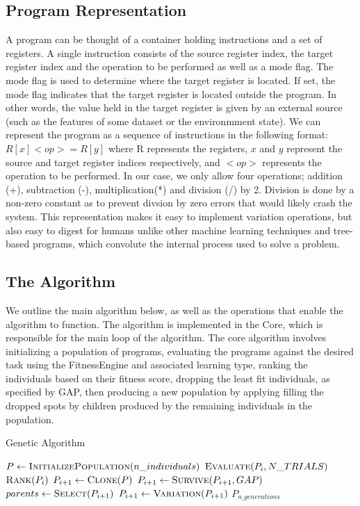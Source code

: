 \documentclass[12pt, final]{dalcsthesis}
\begin{document}
\subsection{Program Representation}
A program can be thought of a container holding instructions and a set of registers. A single instruction consists of the source register index, the target register index and the operation to be performed as well as a mode flag. The mode flag is used to determine where the target register is located. If set, the mode flag indicates that the target register is located outside the program. In other words, the value held in the target register is given by an external source (such as the features of some dataset or the environmment state). We can represent the program as a sequence of instructions in the following format: $R[x] <op>= R[y]$ where R represents the registers, $x$ and $y$ represent the source and target register indices respectively, and $<op>$ represents the operation to be performed. In our case, we only allow four operations; addition (+),
subtraction (-), multiplication(*) and division (/) by 2. Division is done by a non-zero constant as to prevent divsion by zero errors that would likely crash the system. This representation makes it easy to implement variation operations, but also easy to digest for humans unlike other machine learning techniques and tree-based programs, which convolute the internal process used to solve a problem.

\subsection{The Algorithm}

We outline the main algorithm below, as well as the operations that enable
the algorithm to function. The algorithm is implemented in the Core, which is responsible for the main loop of the algorithm. The core algorithm involves initializing a population of programs, evaluating the programs against the desired task using the FitnessEngine and associated learning type, ranking the individuals based on their fitness score,
dropping the least fit individuals, as specified by GAP, then producing a new population by applying filling the
dropped spots by children produced by the remaining individuals in the population.

\begin{algorithm}[hb]
	\caption{Genetic Algorithm}
	\begin{algorithmic}[1]
		\State $P \gets \Call{InitializePopulation}{n\_individuals}$
		\State $\Call{Evaluate}{P_{i}, N\_TRIALS}$
		\State $\Call{Rank}{P_{i}}$ 
		\State $P_{i+1} \gets \Call{Clone}{P}$
		\State $P_{i+1} \gets \Call{Survive}{P_{i+1}, GAP}$ 
		\State $parents \gets \Call{Select}{P_{i+1}}$
		\State $P_{i+1} \gets \Call{Variation}{P_{i+1}}$
		\EndFor
		\State \Return $P_{n\_generations}$
		\EndProcedure
	\end{algorithmic}
\end{algorithm}
\end{document}
